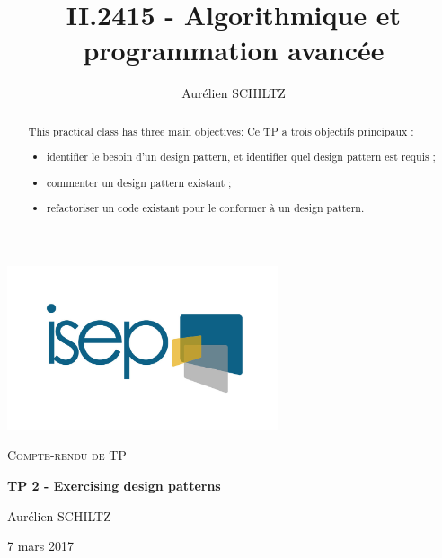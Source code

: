\newcommand*{\ROOT}{./src}



\graphicspath{{\ROOT/}{\ROOT/img/}}



\title{II.2415 - Algorithmique et programmation avancée}
\author{Aurélien SCHILTZ}

\makeatletter
{}
\makeatother



\begin{titlepage}
	\centering
	\includegraphics[width=8cm]{logo}
	\par
	\vspace{4cm}

	{\scshape\Large Compte-rendu de TP\par}
	\vspace{1.5cm}
	{\huge\bfseries TP 2 - Exercising design patterns \par}
	\vspace{2cm}
	{\Large Aurélien SCHILTZ\par}
	\vfill\par
	\par
	\vfill

	{\large 7 mars 2017}
\end{titlepage}


\newpage
\begin{abstract}

  This practical class has three main objectives:
  Ce TP a trois objectifs principaux :
  \begin{itemize}
    \item identifier le besoin d'un design pattern, et identifier quel design pattern est requis ;
    \item commenter un design pattern existant ;
    \item refactoriser un code existant pour le conformer à un design pattern.
  \end{itemize}

\end{abstract}

